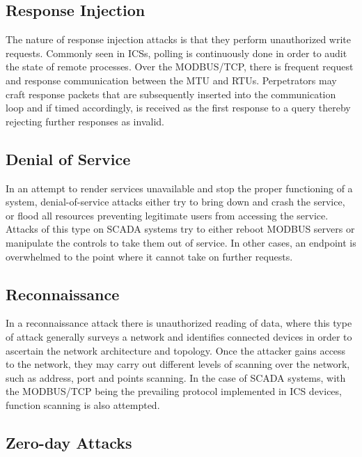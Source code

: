 \documentclass[11pt,]{article}
\begin{document}
\subsection{Response Injection}\label{response-injection}

The nature of response injection attacks is that they perform
unauthorized write requests. Commonly seen in ICSs, polling is
continuously done in order to audit the state of remote processes. Over
the MODBUS/TCP, there is frequent request and response communication
between the MTU and RTUs. Perpetrators may craft response packets that
are subsequently inserted into the communication loop and if timed
accordingly, is received as the first response to a query thereby
rejecting further responses as invalid.

\subsection{Denial of Service}\label{denial-of-service}

In an attempt to render services unavailable and stop the proper
functioning of a system, denial-of-service attacks either try to bring
down and crash the service, or flood all resources preventing legitimate
users from accessing the service. Attacks of this type on SCADA systems
try to either reboot MODBUS servers or manipulate the controls to take
them out of service. In other cases, an endpoint is overwhelmed to the
point where it cannot take on further requests.

\subsection{Reconnaissance}\label{reconnaissance}

In a reconnaissance attack there is unauthorized reading of data, where
this type of attack generally surveys a network and identifies connected
devices in order to ascertain the network architecture and topology.
Once the attacker gains access to the network, they may carry out
different levels of scanning over the network, such as address, port and
points scanning. In the case of SCADA systems, with the MODBUS/TCP being
the prevailing protocol implemented in ICS devices, function scanning is
also attempted.

\subsection{Zero-day Attacks}\label{zero-day-attacks}
\end{document}
